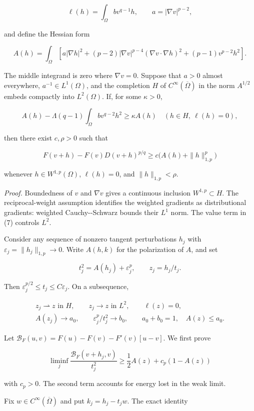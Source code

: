 \documentclass[11pt]{article}
\begin{document}
\[
\ell(h)=\int_\Omega bv^{q-1}h,
\qquad a=|\nabla v|^{p-2},
\]

and define the Hessian form

\[
A(h)=\int_\Omega\left[
 a|\nabla h|^2+(p-2)|\nabla v|^{p-4}(\nabla v\cdot\nabla h)^2
 +(p-1)v^{p-2}h^2\right].
\tag{7}
\]

The middle integrand is zero where \(\nabla v=0\). Suppose that \(a>0\)
almost everywhere, \(a^{-1}\in L^1(\Omega)\), and the completion \(H\)
of \(C^\infty(\overline\Omega)\) in the norm \(A^{1/2}\) embeds
compactly into \(L^2(\Omega)\). If, for some \(\kappa>0\),

\[
A(h)-\Lambda(q-1)\int_\Omega bv^{q-2}h^2\ge\kappa A(h)
\quad(h\in H,\ \ell(h)=0),
\tag{8}
\]

then there exist \(c,\rho>0\) such that

\[
F(v+h)-F(v)D(v+h)^{p/q}
\ge c\bigl(A(h)+\|h\|_{1,p}^p\bigr)
\tag{9}
\]

whenever \(h\in W^{1,p}(\Omega)\), \(\ell(h)=0\), and
\(\|h\|_{1,p}<\rho\).

\emph{Proof.} Boundedness of \(v\) and \(\nabla v\) gives a continuous
inclusion \(W^{1,p}\subset H\). The reciprocal-weight assumption
identifies the weighted gradients as distributional gradients: weighted
Cauchy-\/-Schwarz bounds their \(L^1\) norm. The value term in (7)
controls \(L^2\).

Consider any sequence of nonzero tangent perturbations \(h_j\) with
\(\varepsilon_j=\|h_j\|_{1,p}\to0\). Write \(A(h,k)\) for the
polarization of \(A\), and set

\[
t_j^2=A(h_j)+\varepsilon_j^p,\qquad z_j=h_j/t_j.
\tag{10}
\]

Then \(\varepsilon_j^{p/2}\le t_j\le C\varepsilon_j\). On a subsequence,

\[
\begin{gathered}
z_j\rightharpoonup z\text{ in }H,\qquad z_j\to z\text{ in }L^2,\qquad\ell(z)=0,\\
A(z_j)\to a_0,\qquad \varepsilon_j^p/t_j^2\to b_0,\qquad
 a_0+b_0=1,\quad A(z)\le a_0.
\end{gathered}
\tag{11}
\]

Let \(\mathcal B_F(u,v)=F(u)-F(v)-F'(v)[u-v]\). We first prove

\[
\liminf_j\frac{\mathcal B_F(v+h_j,v)}{t_j^2}
\ge\frac12 A(z)+c_p(1-A(z))
\tag{12}
\]

with \(c_p>0\). The second term accounts for energy lost in the weak
limit.

Fix \(w\in C^\infty(\overline\Omega)\) and put \(k_j=h_j-t_jw\). The
exact identity
\end{document}
